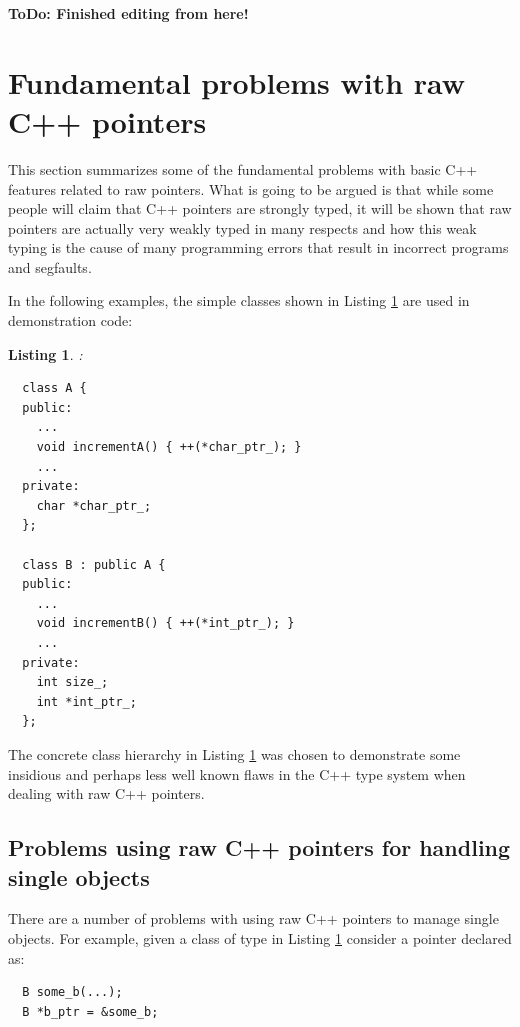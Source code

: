 \documentclass[pdf,ps2pdf,11pt]{SANDreport}
\newtheorem{listing}{Listing}
\begin{document}
{}\textbf{ToDo: Finished editing from here!}


%
{}\section{Fundamental problems with raw C++ pointers}
\label{sec:problems-with-raw-pointers}
%

This section summarizes some of the fundamental problems with basic
C++ features related to raw pointers.  What is going to be argued is
that while some people will claim that C++ pointers are strongly
typed, it will be shown that raw pointers are actually very weakly
typed in many respects and how this weak typing is the cause of many
programming errors that result in incorrect programs and segfaults.

In the following examples, the simple classes shown in Listing
{}\ref{listing:Simple_A_B} are used in demonstration code:

\begin{listing}:\\
\label{listing:Simple_A_B}
{\small\begin{verbatim}
  class A {
  public:
    ...
    void incrementA() { ++(*char_ptr_); }
    ...
  private:
    char *char_ptr_;
  };

  class B : public A {
  public:
    ...
    void incrementB() { ++(*int_ptr_); }
    ...
  private:
    int size_;
    int *int_ptr_;
  };
\end{verbatim}}
\end{listing}

The concrete class hierarchy in Listing {}\ref{listing:Simple_A_B} was
chosen to demonstrate some insidious and perhaps less well known flaws
in the C++ type system when dealing with raw C++ pointers.


%
{}\subsection{Problems using raw C++ pointers for handling single objects}
%

There are a number of problems with using raw C++ pointers to manage
single objects.  For example, given a class of type {} in
Listing {}\ref{listing:Simple_A_B} consider a pointer declared as:

{\small\begin{verbatim}
  B some_b(...);
  B *b_ptr = &some_b;
\end{verbatim}}
\end{document}
